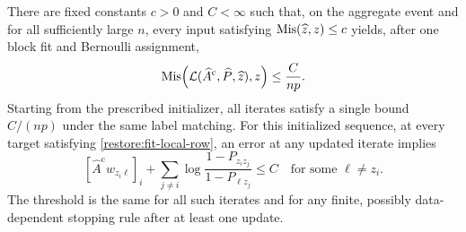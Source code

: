 \begin{lemma}
\label{restore:fit-invariant-basin}
\label{restore:fit-invariant}
There are fixed constants $c>0$ and $C<\infty$ such that, on the
aggregate event and for all sufficiently large $n$, every input
satisfying $\operatorname{Mis}(\widehat z,z)\le c$ yields, after one block fit and
Bernoulli assignment,
\[
 \operatorname{Mis}\!\left(\mathcal L(\widehat A^{\mathrm{c}},\widehat P,\widehat z),z\right)
       \le\frac{C}{np}.
\]
Starting from the prescribed initializer, all iterates satisfy a
single bound $C/(np)$ under the same label matching.
For this initialized sequence, at every target satisfying
\eqref{restore:fit-local-row}, an error at any updated iterate implies
\begin{equation}\label{restore:fit-canonical-error}
 [\widehat A^{\mathrm{c}} w_{z_i\ell}]_i+
 \sum_{j\ne i}\log\frac{1-P_{z_i z_j}}{1-P_{\ell z_j}}\le C
 \quad\text{for some }\ell\ne z_i.
\end{equation}
The threshold is the same for all such iterates and for any finite,
possibly data-dependent stopping rule after at least one update.
\end{lemma}

